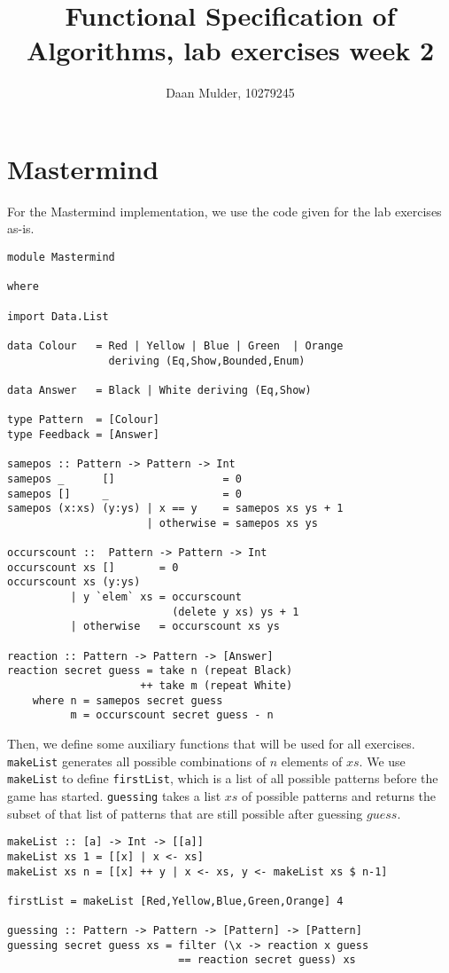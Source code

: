 \documentclass[a4paper,12pt]{amsart}
\begin{document}
\title{Functional Specification of Algorithms, lab exercises week 2}
\author{Daan Mulder, 10279245}
\maketitle
\normalsize

\section*{Mastermind}

For the Mastermind implementation, we use the code given for the lab exercises as-is.
\begin{verbatim}
module Mastermind

where 

import Data.List

data Colour   = Red | Yellow | Blue | Green  | Orange 
                deriving (Eq,Show,Bounded,Enum)

data Answer   = Black | White deriving (Eq,Show)

type Pattern  = [Colour]
type Feedback = [Answer]

samepos :: Pattern -> Pattern -> Int
samepos _      []                 = 0 
samepos []     _                  = 0 
samepos (x:xs) (y:ys) | x == y    = samepos xs ys + 1
                      | otherwise = samepos xs ys 

occurscount ::  Pattern -> Pattern -> Int
occurscount xs []       = 0
occurscount xs (y:ys) 
          | y `elem` xs = occurscount 
                          (delete y xs) ys + 1
          | otherwise   = occurscount xs ys 

reaction :: Pattern -> Pattern -> [Answer]
reaction secret guess = take n (repeat Black) 
                     ++ take m (repeat White)
    where n = samepos secret guess 
          m = occurscount secret guess - n
\end{verbatim}
Then, we define some auxiliary functions that will be used for all exercises. \texttt{makeList} generates all possible combinations of $n$ elements of $xs$. We use \texttt{makeList} to define \texttt{firstList}, which is a list of all possible patterns before the game has started. \texttt{guessing} takes a list $xs$ of possible patterns and returns the subset of that list of patterns that are still possible after guessing $guess$. 
\begin{verbatim}
makeList :: [a] -> Int -> [[a]]
makeList xs 1 = [[x] | x <- xs]
makeList xs n = [[x] ++ y | x <- xs, y <- makeList xs $ n-1]

firstList = makeList [Red,Yellow,Blue,Green,Orange] 4

guessing :: Pattern -> Pattern -> [Pattern] -> [Pattern]
guessing secret guess xs = filter (\x -> reaction x guess
                           == reaction secret guess) xs
\end{verbatim}
\end{document}
